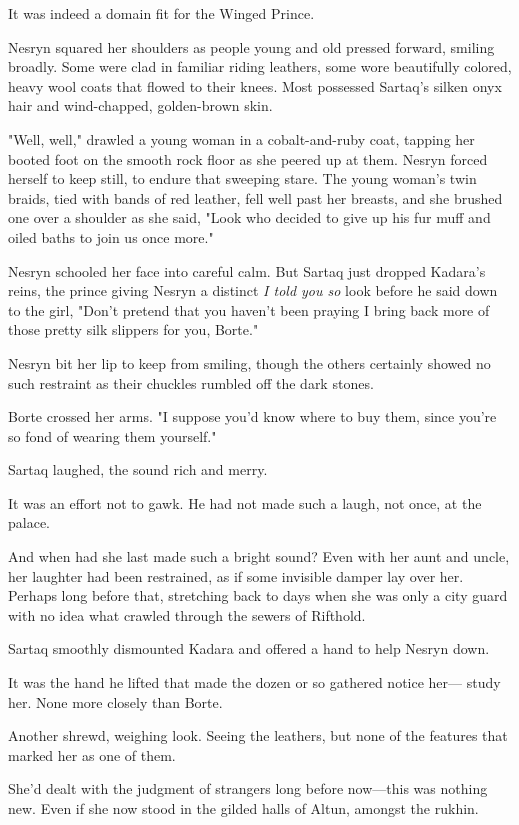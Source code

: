 It was indeed a domain fit for the Winged Prince.

Nesryn squared her shoulders as people young and old pressed forward, smiling broadly.
Some were clad in familiar riding leathers, some wore beautifully colored, heavy wool coats that flowed to their knees.
Most possessed Sartaq's silken onyx hair and wind-chapped, golden-brown skin.

"Well, well," drawled a young woman in a cobalt-and-ruby coat, tapping her booted foot on the smooth rock floor as she peered up at them.
Nesryn forced herself to keep still, to endure that sweeping stare.
The young woman's twin braids, tied with bands of red leather, fell well past her breasts, and she brushed one over a shoulder as she said, "Look who decided to give up his fur muff and oiled baths to join us once more."

Nesryn schooled her face into careful calm.
But Sartaq just dropped Kadara's reins, the prince giving Nesryn a distinct \emph{I told you so}
look before he said down to the girl, "Don't pretend that you haven't been praying I bring back more of those pretty silk slippers for you, Borte."

Nesryn bit her lip to keep from smiling, though the others certainly showed no such restraint as their chuckles rumbled off the dark stones.

Borte crossed her arms.
"I suppose you'd know where to buy them, since you're so fond of wearing them yourself."

Sartaq laughed, the sound rich and merry.

It was an effort not to gawk.
He had not made such a laugh, not once, at the palace.

And when had she last made such a bright sound?
Even with her aunt and uncle, her laughter had been restrained, as if some invisible damper lay over her.
Perhaps long before that, stretching back to days when she was only a city guard with no idea what crawled through the sewers of Rifthold.

Sartaq smoothly dismounted Kadara and offered a hand to help Nesryn down.

It was the hand he lifted that made the dozen or so gathered notice her--- study her.
None more closely than Borte.

Another shrewd, weighing look.
Seeing the leathers, but none of the features that marked her as one of them.

She'd dealt with the judgment of strangers long before now---this was nothing new.
Even if she now stood in the gilded halls of Altun, amongst the rukhin.

